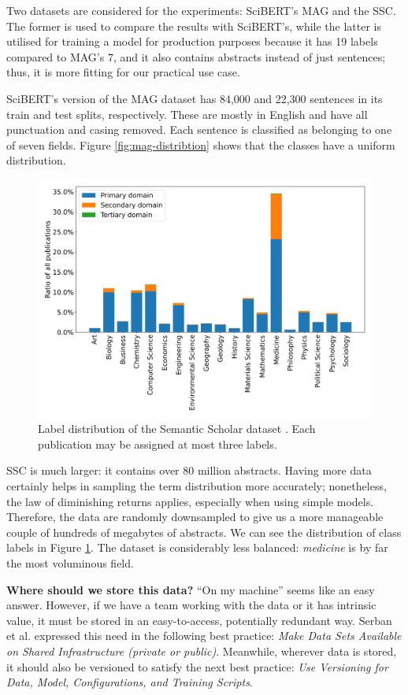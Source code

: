 Two datasets are considered for the experiments: SciBERT's MAG and the SSC. The former is used to compare the results with SciBERT's, while the latter is utilised for training a model for production purposes because it has 19 labels compared to MAG's 7, and it also contains abstracts instead of just sentences; thus, it is more fitting for our practical use case.

SciBERT's version of the MAG dataset has 84,000 and 22,300 sentences in its train and test splits, respectively. These are mostly in English and have all punctuation and casing removed. Each sentence is classified as belonging to one of seven fields. Figure \ref{fig:mag-distribtion} shows that the classes have a uniform distribution. 

\begin{figure}[H]
    \centering
    \includegraphics[width=0.8\linewidth]{figures/ss-distribution.png}
    \captionsetup{width=.9\linewidth}
    \caption{Label distribution of the Semantic Scholar dataset \cite{Lo2020S2ORCTS}. Each publication may be assigned at most three labels.}
    \label{fig:ss-distribution}
\end{figure}

SSC is much larger: it contains over 80 million abstracts. Having more data certainly helps in sampling the term distribution more accurately; nonetheless, the law of diminishing returns applies, especially when using simple models. Therefore, the data are randomly downsampled to give us a more manageable couple of hundreds of megabytes of abstracts. We can see the distribution of class labels in Figure \ref{fig:ss-distribution}. The dataset is considerably less balanced: \textit{medicine} is by far the most voluminous field.

\begin{displayquote}
\textbf{Where should we store this data?} ``On my machine'' seems like an easy answer. However, if we have a team working with the data or it has intrinsic value, it must be stored in an easy-to-access, potentially redundant way. Serban et al. \cite{serban2020adoption} expressed this need in the following best practice: \textit{Make Data Sets Available on Shared Infrastructure (private or public)}. Meanwhile, wherever data is stored, it should also be versioned to satisfy the next best practice: \textit{Use Versioning for Data, Model, Configurations, and Training Scripts}.
\end{displayquote}

